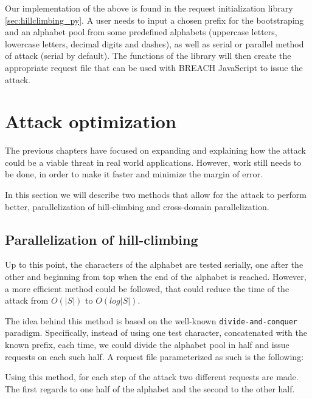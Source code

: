 Our implementation of the above is found in the request initialization library
\ref{sec:hillclimbing_py}. A user needs to input a chosen prefix for the
bootstraping and an alphabet pool from some predefined alphabets (uppercase
letters, lowercase letters, decimal digits and dashes), as well as serial or
parallel method of attack (serial by default). The functions of the library will
then create the appropriate request file that can be used with BREACH JavaScript
to issue the attack.

\section{Attack optimization}\label{sec:optimize}

The previous chapters have focused on expanding and explaining how the attack
could be a viable threat in real world applications. However, work still needs to be
done, in order to make it faster and minimize the margin of error.

In this section we will describe two methods that allow for the attack to
perform better, parallelization of hill-climbing and cross-domain
parallelization.

\subsection{Parallelization of hill-climbing}

Up to this point, the characters of the alphabet are tested serially, one after
the other and beginning from top when the end of the alphabet is reached.
However, a more efficient method could be followed, that could reduce the time
of the attack from \begin{math}O(|S|)\end{math} to
\begin{math}O(log|S|)\end{math}.

The idea behind this method is based on the well-known \texttt{divide-and-conquer}
paradigm. Specifically, instead of using one test character, concatenated with
the known prefix, each time, we could divide the alphabet pool in half and issue
requests on each such half. A request file parameterized as such is the
following:


Using this method, for each step of the attack two different requests are made.
The first regards to one half of the alphabet and the second to the other half.

